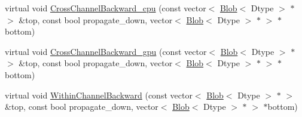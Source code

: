 \begin{DoxyCompactItemize}
\item 
virtual void \hyperlink{classcaffe_1_1_l_r_n_layer_ac2a6d21611db7683d6996988722d50a3}{Cross\+Channel\+Backward\+\_\+cpu} (const vector$<$ \hyperlink{classcaffe_1_1_blob}{Blob}$<$ Dtype $>$ $\ast$ $>$ \&top, const bool propagate\+\_\+down, vector$<$ \hyperlink{classcaffe_1_1_blob}{Blob}$<$ Dtype $>$ $\ast$ $>$ $\ast$bottom)
\item 
virtual void \hyperlink{classcaffe_1_1_l_r_n_layer_a5dc43ada322516ebd9cee01eb56e19f8}{Cross\+Channel\+Backward\+\_\+gpu} (const vector$<$ \hyperlink{classcaffe_1_1_blob}{Blob}$<$ Dtype $>$ $\ast$ $>$ \&top, const bool propagate\+\_\+down, vector$<$ \hyperlink{classcaffe_1_1_blob}{Blob}$<$ Dtype $>$ $\ast$ $>$ $\ast$bottom)
\item 
virtual void \hyperlink{classcaffe_1_1_l_r_n_layer_aef8f2723840441b902addf88aa309e07}{Within\+Channel\+Backward} (const vector$<$ \hyperlink{classcaffe_1_1_blob}{Blob}$<$ Dtype $>$ $\ast$ $>$ \&top, const bool propagate\+\_\+down, vector$<$ \hyperlink{classcaffe_1_1_blob}{Blob}$<$ Dtype $>$ $\ast$ $>$ $\ast$bottom)
\end{DoxyCompactItemize}
